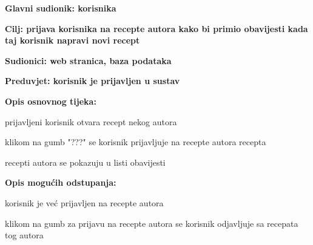 					\noindent {}
					\begin{packed_item}
						\item \textbf{Glavni sudionik: korisnika}
						\item  \textbf{Cilj: prijava korisnika na recepte autora kako bi primio obavijesti kada taj korisnik napravi novi recept}
						\item  \textbf{Sudionici: web stranica, baza podataka}
						\item  \textbf{Preduvjet: korisnik je prijavljen u sustav}
						
						\item  \textbf{Opis osnovnog tijeka:}
						\item[] \begin{packed_enum}
							\item prijavljeni korisnik otvara recept nekog autora
							\item klikom na gumb "???" se korisnik prijavljuje na recepte autora recepta
							\item recepti autora se pokazuju u listi obavijesti
						\end{packed_enum}
						
						\item  \textbf{Opis mogućih odstupanja:}
						\item[] \begin{packed_item}							
							\item korisnik je već prijavljen na recepte autora
							\begin{packed_item}
								\item klikom na gumb za prijavu na recepte autora se korisnik odjavljuje sa recepata tog autora
							\end{packed_item}
						\end{packed_item}
					\end{packed_item}
				
				
				
